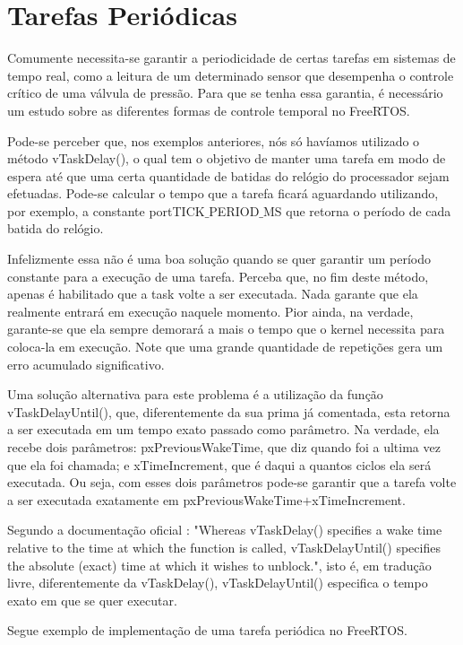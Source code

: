 \documentclass[a4paper,12pt]{article}
\begin{document}
	\section{Tarefas Periódicas}
	Comumente necessita-se garantir a periodicidade de certas tarefas em sistemas de tempo real, como a leitura de um determinado sensor que desempenha o controle crítico de uma válvula de pressão. Para que se tenha essa garantia, é necessário um estudo sobre as diferentes formas de controle temporal no FreeRTOS.
	
	Pode-se perceber que, nos exemplos anteriores, nós só havíamos utilizado o método vTaskDelay(), o qual tem o objetivo de manter uma tarefa em modo de espera até que uma certa quantidade de batidas do relógio do processador sejam efetuadas. Pode-se calcular o tempo que a tarefa ficará aguardando utilizando, por exemplo, a constante portTICK$\_$PERIOD$\_$MS que retorna o período de cada batida do relógio.
	
	Infelizmente essa não é uma boa solução quando se quer garantir um período constante para a execução de uma tarefa. Perceba que, no fim deste método, apenas é habilitado que a task volte a ser executada. Nada garante que ela realmente entrará em execução naquele momento. Pior ainda, na verdade, garante-se que ela sempre demorará a mais o tempo que o kernel necessita para coloca-la em execução. Note que uma grande quantidade de repetições gera um erro acumulado significativo.
	
	Uma solução alternativa para este problema é a utilização da função vTaskDelayUntil(), que, diferentemente da sua prima já comentada, esta retorna a ser executada em um tempo exato passado como parâmetro. Na verdade, ela recebe dois parâmetros: pxPreviousWakeTime, que diz quando foi a ultima vez que ela foi chamada; e xTimeIncrement, que é daqui a quantos ciclos ela será executada. Ou seja, com esses dois parâmetros pode-se garantir que a tarefa volte a ser executada exatamente em pxPreviousWakeTime$+$xTimeIncrement.
	
	Segundo a documentação oficial \cite{barry2009freertos}: "Whereas vTaskDelay() specifies a wake time relative to the time at which the function is called, vTaskDelayUntil() specifies the absolute (exact) time at which it wishes to unblock.", isto é, em tradução livre, diferentemente da vTaskDelay(), vTaskDelayUntil() especifica o tempo exato em que se quer executar.
	
	Segue exemplo de implementação de uma tarefa periódica no FreeRTOS.
	
	
	
	
	
	
\end{document}
